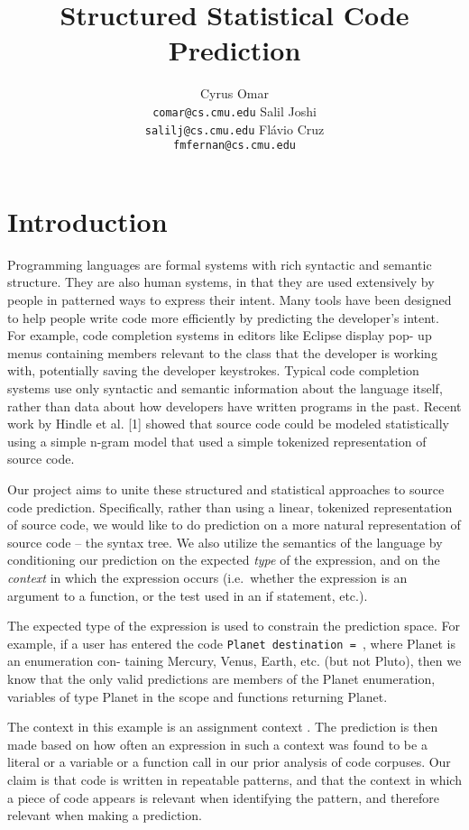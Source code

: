 \documentclass{article} %
\title{Structured Statistical Code Prediction}
\author{
  Cyrus Omar\\
  \texttt{comar@cs.cmu.edu}
  \And
  Salil Joshi\\
  \texttt{salilj@cs.cmu.edu}
  \And Fl\'avio Cruz\\
  \texttt{fmfernan@cs.cmu.edu}
}
\begin{document}
\maketitle

\section*{Introduction}
Programming languages are formal systems with rich syntactic and semantic structure. They are
also human systems, in that they are used extensively by people in patterned ways to express their
intent. Many tools have been designed to help people write code more efficiently by predicting
the developer’s intent. For example, code completion systems in editors like Eclipse display pop-
up menus containing members relevant to the class that the developer is working with, potentially
saving the developer keystrokes. Typical code completion systems use only syntactic and semantic
information about the language itself, rather than data about how developers have written programs
in the past. Recent work by Hindle et al. [1] showed that source code could be modeled statistically
using a simple n-gram model that used a simple tokenized representation of source code.

Our project aims to unite these structured and statistical approaches to source code prediction.
Specifically, rather than using a linear, tokenized representation of source code, we would like to do
prediction on a more natural representation of source code – the syntax tree.  We also utilize the semantics of the language by conditioning our prediction on the expected \emph{type} of the expression, and on the \emph{context} in which the expression occurs (i.e.\ whether the expression is an argument to a function, or the test used in an if statement, etc.).

The expected type of the expression is used to constrain the prediction space.  For example, if a
user has entered the code \texttt{Planet destination = }, where Planet is an enumeration con-
taining Mercury, Venus, Earth, etc. (but not Pluto), then we know that the only valid predictions are members of the Planet enumeration, variables of type Planet in the scope and functions returning Planet. 

The context in this example is an assignment context . The prediction is then made based on how often an expression in such a context was found to be a literal or a variable or a function call in our prior analysis of code corpuses. Our claim is that code is written in repeatable patterns, and that the context in which a piece of code appears is relevant when identifying the pattern, and therefore relevant when making a prediction.
\end{document}
